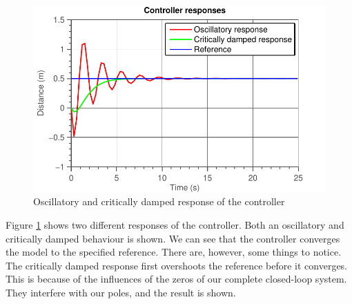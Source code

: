 \documentclass[11pt,titlepage]{report}
\begin{document}
\begin{figure}[H]
	\begin{center}
		\includegraphics[width=0.7\linewidth]{resource/controller.pdf}
	\end{center}
	\caption{Oscillatory and critically damped response of the controller}
	\label{fig:ass-2-controller-response}
\end{figure}

Figure \ref{fig:ass-2-controller-response} shows two different responses of the controller. Both an oscillatory and critically damped behaviour is shown. We can see that the controller converges the model to the specified reference. There are, however, some things to notice. The critically damped response first overshoots the reference before it converges. This is because of the influences of the zeros of our complete closed-loop system. They interfere with our poles, and the result is shown.
\end{document}
